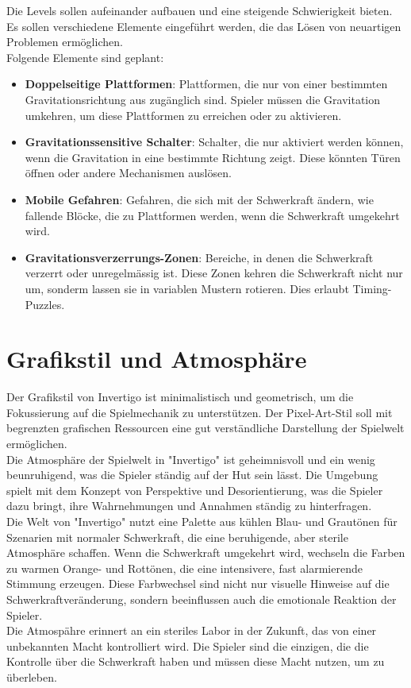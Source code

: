 \documentclass{article}
\begin{document}
Die Levels sollen aufeinander aufbauen und eine steigende Schwierigkeit bieten.
Es sollen verschiedene Elemente eingeführt werden, die das Lösen von neuartigen Problemen ermöglichen.
\\
Folgende Elemente sind geplant:
\begin{itemize}
    \item \textbf{Doppelseitige Plattformen}: Plattformen, die nur von einer bestimmten Gravitationsrichtung aus zugänglich sind.
    Spieler müssen die Gravitation umkehren, um diese Plattformen zu erreichen oder zu aktivieren.
    \item \textbf{Gravitationssensitive Schalter}: Schalter, die nur aktiviert werden können, wenn die Gravitation in eine bestimmte Richtung zeigt.
    Diese könnten Türen öffnen oder andere Mechanismen auslösen.
    \item \textbf{Mobile Gefahren}: Gefahren, die sich mit der Schwerkraft ändern, wie fallende Blöcke, die zu Plattformen werden, wenn die Schwerkraft umgekehrt wird.
    \item \textbf{Gravitationsverzerrungs-Zonen}: Bereiche, in denen die Schwerkraft verzerrt oder unregelmässig ist. Diese Zonen kehren die Schwerkraft nicht nur um,
    sonderm lassen sie in variablen Mustern rotieren. Dies erlaubt Timing-Puzzles.
\end{itemize}

\section{Grafikstil und Atmosphäre}

Der Grafikstil von Invertigo ist minimalistisch und geometrisch, um die Fokussierung auf die Spielmechanik zu unterstützen.
Der Pixel-Art-Stil soll mit begrenzten grafischen Ressourcen eine gut verständliche Darstellung der Spielwelt ermöglichen.
\\
Die Atmosphäre der Spielwelt in "Invertigo" ist geheimnisvoll und ein wenig beunruhigend, was die Spieler ständig auf der Hut sein lässt.
Die Umgebung spielt mit dem Konzept von Perspektive und Desorientierung, was die Spieler dazu bringt, ihre Wahrnehmungen und Annahmen ständig zu hinterfragen.
\\
Die Welt von "Invertigo" nutzt eine Palette aus kühlen Blau- und Grautönen für Szenarien mit normaler Schwerkraft, die eine beruhigende, aber sterile Atmosphäre schaffen.
Wenn die Schwerkraft umgekehrt wird, wechseln die Farben zu warmen Orange- und Rottönen, die eine intensivere, fast alarmierende Stimmung erzeugen.
Diese Farbwechsel sind nicht nur visuelle Hinweise auf die Schwerkraftveränderung, sondern beeinflussen auch die emotionale Reaktion der Spieler.
\\
Die Atmospähre erinnert an ein steriles Labor in der Zukunft, das von einer unbekannten Macht kontrolliert wird.
Die Spieler sind die einzigen, die die Kontrolle über die Schwerkraft haben und müssen diese Macht nutzen, um zu überleben.
\end{document}
